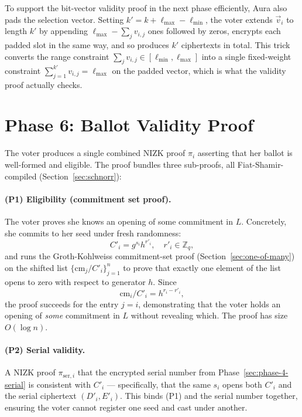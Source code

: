 \documentclass[12pt,a4paper,oneside]{report}
\begin{document}
To support the bit-vector validity proof in the next phase efficiently, 
Aura also pads the selection vector. Setting $k' = k + \ell_{\max} - \ell_{\min}$, 
the voter extends $\vec{v}_i$ to length $k'$ by appending 
$\ell_{\max} - \sum_j v_{i, j}$ ones followed by zeros, encrypts each 
padded slot in the same way, and so produces $k'$ ciphertexts in total. 
This trick converts the range constraint 
$\sum_j v_{i, j} \in [\ell_{\min}, \ell_{\max}]$ into a single 
fixed-weight constraint $\sum_{j=1}^{k'} v_{i, j} = \ell_{\max}$ on the 
padded vector, which is what the validity proof actually checks.

\section{Phase 6: Ballot Validity Proof}
\label{sec:phase-6-validity}

The voter produces a single combined NIZK proof $\pi_i$ asserting that 
her ballot is well-formed and eligible. The proof bundles three 
sub-proofs, all Fiat-Shamir-compiled (Section~\ref{sec:schnorr}):

\paragraph{(P1) Eligibility (commitment set proof).}
The voter proves she knows an opening of some commitment in $L$. 
Concretely, she commits to her seed under fresh randomness:
\[
    C'_i = g^{s_i} h^{r'_i}, \quad r'_i \in \mathbb{Z}_q,
\]
and runs the Groth-Kohlweiss commitment-set proof 
(Section~\ref{sec:one-of-many}) on the shifted list 
$\{\text{cm}_j / C'_i\}_{j=1}^{n}$ to prove that exactly one element of 
the list opens to zero with respect to generator $h$. Since
\[
    \text{cm}_i / C'_i = h^{r_i - r'_i},
\]
the proof succeeds for the entry $j = i$, demonstrating that the voter 
holds an opening of \textit{some} commitment in $L$ without revealing 
which. The proof has size $O(\log n)$.

\paragraph{(P2) Serial validity.}
A NIZK proof $\pi_{\text{ser}, i}$ that the encrypted serial number 
from Phase~\ref{sec:phase-4-serial} is consistent with $C'_i$ --- 
specifically, that the same $s_i$ opens both $C'_i$ and the serial 
ciphertext $(D'_i, E'_i)$. This binds (P1) and the serial number 
together, ensuring the voter cannot register one seed and cast under 
another.
\end{document}
